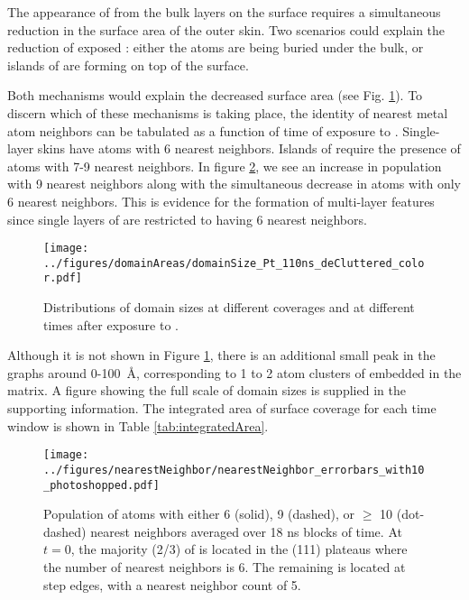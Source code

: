 \documentclass[journal = jpccck, manuscript = article]{achemso}
\begin{document}
The appearance of  from the bulk layers on the surface requires
a simultaneous reduction in the surface area of the outer 
skin. Two scenarios could explain the reduction of exposed :
either the  atoms are being buried under the  bulk, or
islands of  are forming on top of the  surface.

Both mechanisms would explain the decreased  surface area (see
Fig.  \ref{fig:domainAreasPt}).  To discern which of these mechanisms
is taking place, the identity of nearest metal atom neighbors can be
tabulated as a function of time of exposure to . Single-layer
 skins have atoms with 6  nearest neighbors. Islands of
 require the presence of  atoms with 7-9  nearest
neighbors. In figure \ref{fig:nearestNeighbors}, we see an increase in
 population with 9  nearest neighbors along with the
simultaneous decrease in  atoms with only 6  nearest
neighbors.  This is evidence for the formation of multi-layer 
features since single layers of  are restricted to having 6
 nearest neighbors.

\begin{figure}
\texttt{[image: ../figures/domainAreas/domainSize\_Pt\_110ns\_deCluttered\_color.pdf]}
\caption{Distributions of  domain sizes at different 
  coverages and at different times after exposure to .}
\label{fig:domainAreasPt}
\end{figure}

Although it is not shown in Figure \ref{fig:domainAreasPt}, there is
an additional small peak in the  graphs around 0-100~\AA,
corresponding to 1 to 2 atom clusters of  embedded in the
 matrix.  A figure showing the full scale of domain sizes is
supplied in the supporting information.  The integrated area of
surface coverage for each time window is shown in Table
\ref{tab:integratedArea}.

\begin{figure}
  \texttt{[image: ../figures/nearestNeighbor/nearestNeighbor\_errorbars\_with10\_photoshopped.pdf]}
  \caption{Population of  atoms with either 6 (solid), 9
    (dashed), or $\ge$ 10 (dot-dashed)  nearest neighbors
    averaged over 18 ns blocks of time.  At $t=0$, the majority
    (2/3) of  is located in the (111) plateaus where
    the number of  nearest neighbors is 6. The remaining
     is located at step edges, with a nearest neighbor 
    count of 5.} \label{fig:nearestNeighbors}
\end{figure}
\end{document}
